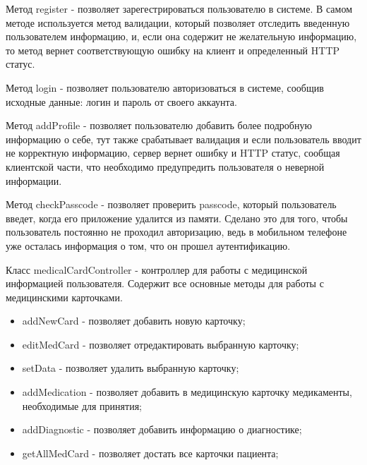Метод register - позволяет зарегестрироваться пользователю в системе. В самом методе используется метод валидации, который позволяет отследить введенную пользователем информацию, и, если она содержит не желательную информацию, то метод вернет соответствующую ошибку на клиент и определенный HTTP статус.

Метод login - позволяет пользователю авторизоваться в системе, сообщив исходные данные: логин и пароль от своего аккаунта.

Метод addProfile - позволяет пользователю добавить более подробную информацию о себе, тут также срабатывает валидация и если пользователь вводит не корректную информацию, сервер вернет ошибку и HTTP статус, сообщая клиентской части, что необходимо предупредить пользователя о неверной информации.

Метод checkPasscode - позволяет проверить passcode, который пользователь введет, когда его приложение удалится из памяти. Сделано это для того, чтобы пользователь постоянно не проходил авторизацию, ведь в мобильном телефоне уже осталась информация о том, что он прошел аутентификацию.

Класс medicalCardController - контроллер для работы с медицинской информацией пользователя. Содержит все основные методы для работы с медицинскими карточками.

\begin{itemize}
  \item addNewCard - позволяет добавить новую карточку;
  \item editMedCard - позволяет отредактировать выбранную карточку;
  \item setData - позволяет удалить выбранную карточку;
  \item addMedication - позволяет добавить в медицинскую карточку медикаменты, необходимые для принятия;
  \item addDiagnostic - позволяет добавить информацию о диагностике;
  \item getAllMedCard - позволяет достать все карточки пациента;
\end{itemize}


